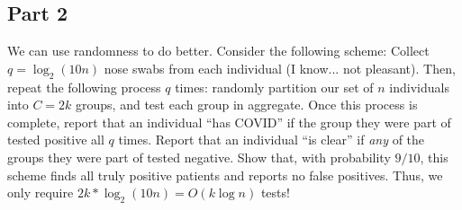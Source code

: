 \documentclass{article}
\begin{document}
\subsection*{Part 2}
We can use randomness to do better. Consider the following scheme: Collect $q = \log_2 (10n)$ nose swabs from each individual (I know... not pleasant). Then, repeat the following process $q$ times: randomly partition our set of $n$ individuals into $C=2k$ groups, and test each group in aggregate. Once this process is complete, report that an individual ``has COVID'' if the group they were part of tested positive all $q$ times. Report that an individual ``is clear'' if \emph{any} of the groups they were part of tested negative. Show that, with probability $9/10$, this scheme finds all truly positive patients and reports no false positives. Thus, we only require $2k * \log_2(10n) = O(k\log n)$ tests!

%
\end{document}
